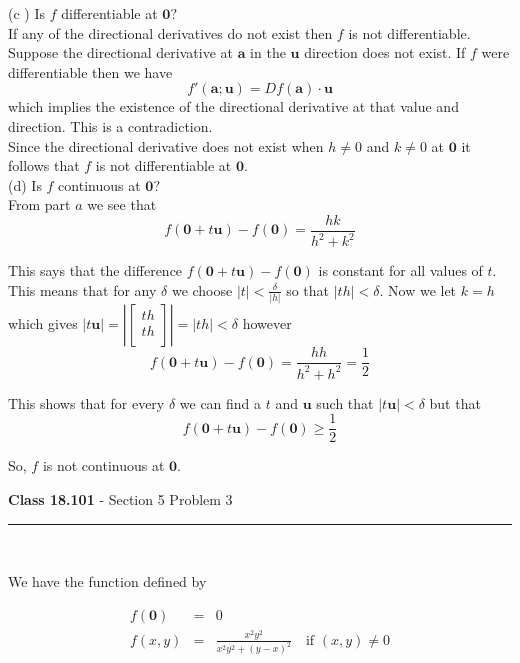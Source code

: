 \documentclass[11pt,reqno]{article}
\begin{document}
\noindent (c ) Is $f$ differentiable at $\textbf{0}?$\\

If any of the directional derivatives do not exist then $f$ is not differentiable. Suppose the directional derivative at $\textbf{a}$ in the $\textbf{u}$ direction does not exist. If $f$ were differentiable then we have 
\[ f'(\textbf{a};\textbf{u}) = Df(\textbf{a}) \cdot \textbf{u} \]
which implies the existence of the directional derivative at that value and direction. This is a contradiction. \\ 
\indent Since the directional derivative does not exist when $h \neq 0$ and $k \neq 0$ at $\textbf{0}$ it follows that $f$ is not differentiable at $\textbf{0}$. \\

\noindent (d) Is $f$ continuous at $\textbf{0}?$\\

\noindent From part $a$ we see that
\[ f(\textbf{0} + t \textbf{u}) - f(\textbf{0})  = \frac{h k}{h^2 + k^2} \]

This says that the difference $f(\textbf{0} + t \textbf{u}) - f(\textbf{0})$ is constant for all values of $t$. This means that for any $\delta$ we choose $|t| < \frac{\delta}{|h|}$ so that $|t h| < \delta$. Now we let $k = h$ which gives $|t \textbf{u}| = \left| \left[ \begin{array}{c} th\\ th\\ \end{array} \right] \right| = |t h| < \delta$ however
\[  f(\textbf{0} + t \textbf{u}) - f(\textbf{0})  = \frac{h h}{h^2 + h^2} = \frac{1}{2} \]

\noindent This shows that for every $\delta$ we can find a $t$ and $\textbf{u}$ such that $|t \textbf{u}| < \delta$ but that 
\[  f(\textbf{0} + t \textbf{u}) - f(\textbf{0}) \ge \frac{1}{2} \]

\noindent So, $f$ is not continuous at $\textbf{0}$.

\vspace{15pt}
\begin{flushleft} 
\textbf{Class 18.101} - Section 5 Problem 3\\
\rule{500pt}{1pt}\\
\end{flushleft} 

\noindent We have the function defined by

\begin{eqnarray*} 
f(\textbf{0}) &=& 0 \\
f(x,y) &=& \frac{x^2 y^2}{x^2 y^2 + (y - x)^2} \quad \text{if $(x,y) \neq 0$} \\
\end{eqnarray*}
\end{document}

